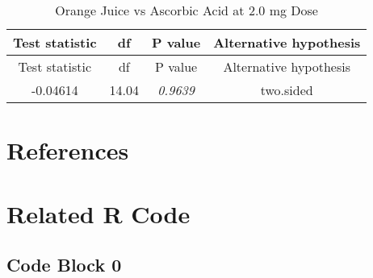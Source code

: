 \documentclass[]{article}
\begin{document}
\begin{longtable}[c]{@{}cccc@{}}
\caption{Orange Juice vs Ascorbic Acid at 2.0 mg Dose}\tabularnewline
\toprule
\begin{minipage}[b]{0.21\columnwidth}\centering\strut
Test statistic
\strut\end{minipage} &
\begin{minipage}[b]{0.07\columnwidth}\centering\strut
df
\strut\end{minipage} &
\begin{minipage}[b]{0.12\columnwidth}\centering\strut
P value
\strut\end{minipage} &
\begin{minipage}[b]{0.30\columnwidth}\centering\strut
Alternative hypothesis
\strut\end{minipage}\tabularnewline
\midrule
\endfirsthead
\toprule
\begin{minipage}[b]{0.21\columnwidth}\centering\strut
Test statistic
\strut\end{minipage} &
\begin{minipage}[b]{0.07\columnwidth}\centering\strut
df
\strut\end{minipage} &
\begin{minipage}[b]{0.12\columnwidth}\centering\strut
P value
\strut\end{minipage} &
\begin{minipage}[b]{0.30\columnwidth}\centering\strut
Alternative hypothesis
\strut\end{minipage}\tabularnewline
\midrule
\endhead
\begin{minipage}[t]{0.21\columnwidth}\centering\strut
-0.04614
\strut\end{minipage} &
\begin{minipage}[t]{0.07\columnwidth}\centering\strut
14.04
\strut\end{minipage} &
\begin{minipage}[t]{0.12\columnwidth}\centering\strut
\emph{0.9639}
\strut\end{minipage} &
\begin{minipage}[t]{0.30\columnwidth}\centering\strut
two.sided
\strut\end{minipage}\tabularnewline
\bottomrule
\end{longtable}

\section{References}\label{references}

\section{Related R Code}\label{related-r-code}

\subsection{Code Block 0}\label{code-block-0}


\end{document}
